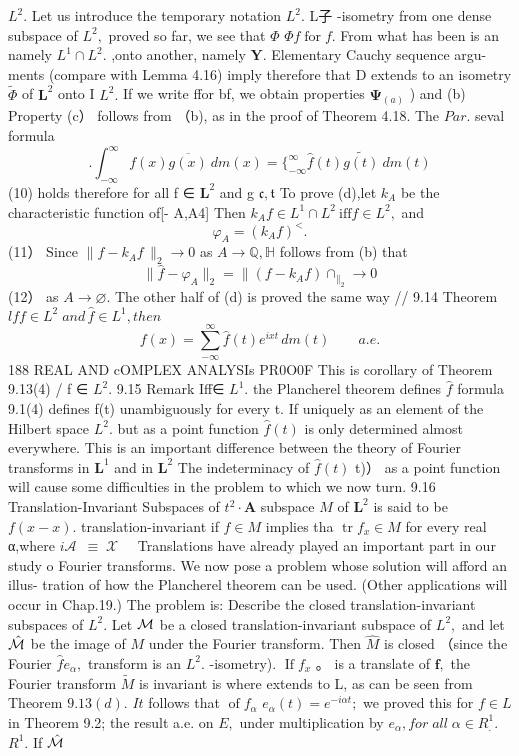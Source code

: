 $L^{2}.$ Let us introduce the temporary notation $L^{2}.$ L子 -isometry from one dense subspace of $L^{2},$ proved so far, we see that $\Phi$ $\Phi f\operatorname{for}f.$ From what has been is an namely $L^{1}\cap L^{2}.$ ,onto another, namely ${\boldsymbol{Y}}.$ Elementary Cauchy sequence argu- ments (compare with Lemma 4.16) imply therefore that D extends to an isometry $\widetilde\Phi$ of ${\boldsymbol{L}}^{2}$ onto I $L^{2}.$ If we write ffor bf, we obtain properties $\mathbf{\Psi}_{(a)}$ ) and (b) Property (c） follows from （b), as in the proof of Theorem 4.18. The $P a r.$ seval formula $$ .\int_{-\infty}^{\infty}f(x){\overline{{g(x)}}}\ d m(x)= \{_{-\infty}^{\infty}{\hat{f}}(t){\widetilde{g(t)}}\ d m(t) $$ (10) holds therefore for all f ∈ ${\boldsymbol{L}}^{2}$ and g ${\mathfrak{c}},{\mathfrak{t}}$ To prove (d),let $k_{A}$ be the characteristic function of[- A,A4] Then $k_{A}f\in L^{1}\cap L^{2}\ {\mathrm{iff}}f\in L^{2},$ and $$ \varphi_{A}=(k_{A}f)^{<}. $$ (11） Since $\|f-k_{A}f\,\|_{2}\to0$ as $A\to\mathbb{Q},\mathbb{H}$ follows from (b) that $$ \|{\hat{f}}-\varphi_{A}\|_{2}=\|(f-k_{A}f)\cap_{\|_{2}}\to0 $$ (12） as $A\to\varnothing.$ The other half of (d) is proved the same way // 9.14 Theorem $l f f\in L^{2}\;a n d\,{\hat{f}}\in L^{1},t h e n$ $$ f(x)=\sum_{-\infty}^{\infty}{\hat{f}}(t)e^{i x t}\,d m(t)\qquad a.e. $$188 REAL AND cOMPLEX ANALYSIs PR0O0F This is corollary of Theorem 9.13(4) / f ∈ $L^{2}.$ 9.15 Remark Iff∈ $L^{1}.$ the Plancherel theorem defines $\hat{f}$ formula 9.1(4) defines f(t) unambiguously for every t. If uniquely as an element of the Hilbert space $L^{2}.$ but as a point function ${\hat{f}}(t)$ is only determined almost everywhere. This is an important difference between the theory of Fourier transforms in ${\boldsymbol{L}}^{1}$ and in ${\boldsymbol{L}}^{2}$ The indeterminacy of ${\hat{f}}(t)$ t)） as a point function will cause some difficulties in the problem to which we now turn. 9.16 Translation-Invariant Subspaces of $\scriptstyle t^{2}\cdot\mathbf{A}$ subspace $\textstyle{M}$ of ${\boldsymbol{L}}^{2}$ is said to be $f(x-x).$ translation-invariant if $f\in M$ implies tha $\operatorname{tr}f_{x}\in M$ for every real α,where $\scriptstyle{i{\mathcal{A}}\ \;\equiv\;{\mathcal{X}}\;\ \;\;}$ Translations have already played an important part in our study o Fourier transforms. We now pose a problem whose solution will afford an illus- tration of how the Plancherel theorem can be used. (Other applications will occur in Chap.19.) The problem is: Describe the closed translation-invariant subspaces of $L^{2}.$ Let ${\cal{M}}$ be a closed translation-invariant subspace of $L^{2},$ and let $\hat{\cal M}$ be the image of $\textstyle{M}$ under the Fourier transform. Then $\hat{M}$ is closed （since the Fourier ${\hat{f}}e_{\alpha},$ transform is an $L^{2}.$ -isometry). $\operatorname{If}f_{x}$ 。 is a translate of ${\boldsymbol{f}},$ the Fourier transform $\tilde{M}$ is invariant is where extends to L, as can be seen from Theorem $9.13(d).$ ${\mathit{I}}t$ follows that $\operatorname{of}f_{\alpha}$ $e_{\alpha}(t)=e^{-i\alpha t};$ we proved this for $f\in L$ in Theorem 9.2; the result a.e. on $E,$ under multiplication by $e_{\alpha},f o r\;a l l\;\alpha\in R_{.}^{1}.$ $R^{1}.$ If $\hat{\cal M}$ 